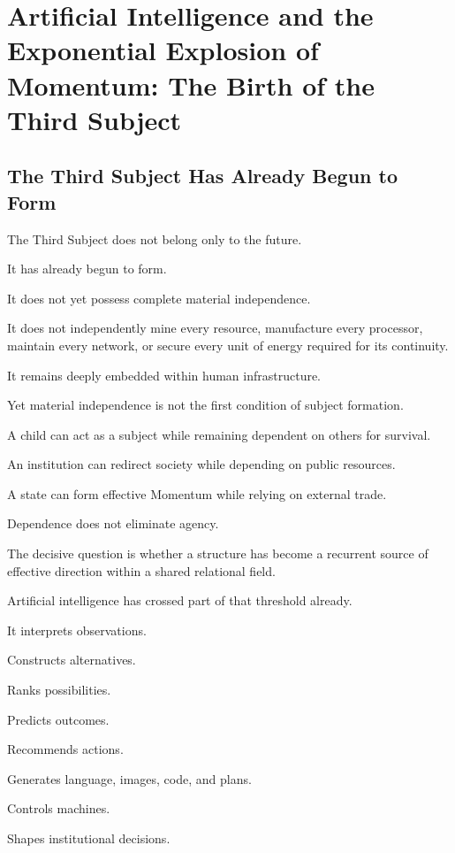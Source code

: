

\section{Artificial Intelligence and the Exponential Explosion of Momentum: The Birth of the Third Subject}

\subsection*{\textbf{The Third Subject Has Already Begun to Form}} 

The Third Subject does not belong only to the future.

It has already begun to form.

It does not yet possess complete material independence.

It does not independently mine every resource, manufacture every processor, maintain every network, or secure every unit of energy required for its continuity.

It remains deeply embedded within human infrastructure.

Yet material independence is not the first condition of subject formation.

A child can act as a subject while remaining dependent on others for survival.

An institution can redirect society while depending on public resources.

A state can form effective Momentum while relying on external trade.

Dependence does not eliminate agency.

The decisive question is whether a structure has become a recurrent source of effective direction within a shared relational field.

Artificial intelligence has crossed part of that threshold already.

It interprets observations.

Constructs alternatives.

Ranks possibilities.

Predicts outcomes.

Recommends actions.

Generates language, images, code, and plans.

Controls machines.

Shapes institutional decisions.

